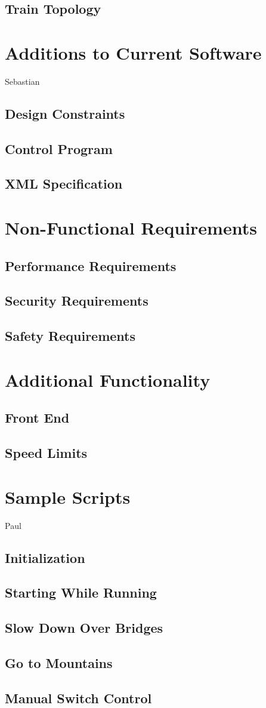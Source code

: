 \documentclass[a4paper,11pt,notitlepage]{article}
\begin{document}
\subsection{Train Topology}

\section{Additions to Current Software}
Sebastian
\subsection{Design Constraints}
\subsection{Control Program}
\subsection{XML Specification}

\section{Non-Functional Requirements}
\subsection{Performance Requirements}
\subsection{Security Requirements}
\subsection{Safety Requirements}

\section{Additional Functionality}
\subsection{Front End}
\subsection{Speed Limits}

\section{Sample Scripts}
Paul
\subsection{Initialization}
\subsection{Starting While Running}
\subsection{Slow Down Over Bridges}
\subsection{Go to Mountains}
\subsection{Manual Switch Control}
\end{document}
